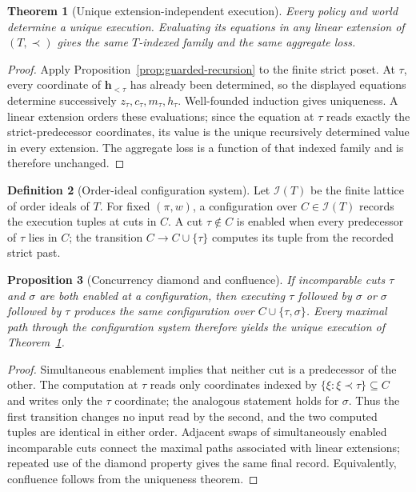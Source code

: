 \documentclass[11pt]{article}
\theoremstyle{plain}
\newtheorem{theorem}{Theorem}[section]
\newtheorem{proposition}[theorem]{Proposition}
\theoremstyle{definition}
\newtheorem{definition}[theorem]{Definition}
\theoremstyle{remark}
\begin{document}
\begin{theorem}[Unique extension-independent execution]
\label{thm:operational-execution}
Every policy and world determine a unique execution. Evaluating its equations in
any linear extension of $(T,\prec)$ gives the same $T$-indexed family and the
same aggregate loss.
\end{theorem}

\begin{proof}
Apply Proposition~\ref{prop:guarded-recursion} to the finite strict poset. At
$\tau$, every
coordinate of $\mathbf h_{<\tau}$ has already been determined, so the displayed
equations determine successively $z_\tau,c_\tau,m_\tau,h_\tau$. Well-founded
induction gives uniqueness. A linear extension orders these evaluations;
since the equation at $\tau$ reads exactly the strict-predecessor coordinates,
its value is the unique recursively determined value in every extension. The
aggregate loss is a function of that indexed family and is therefore unchanged.
\end{proof}

\begin{definition}[Order-ideal configuration system]
\label{def:order-ideal-configuration}
Let $\mathcal I(T)$ be the finite lattice of order ideals of $T$. For fixed
$(\pi,w)$, a configuration over $C\in\mathcal I(T)$ records the execution
tuples at cuts in $C$. A cut $\tau\notin C$ is enabled when every predecessor
of $\tau$ lies in $C$; the transition $C\to C\cup\{\tau\}$ computes its tuple
from the recorded strict past.
\end{definition}

\begin{proposition}[Concurrency diamond and confluence]
\label{prop:operational-confluence}
If incomparable cuts $\tau$ and $\sigma$ are both enabled at a configuration,
then executing $\tau$ followed by $\sigma$ or $\sigma$ followed by $\tau$
produces the same configuration over $C\cup\{\tau,\sigma\}$. Every maximal path
through the configuration system therefore yields the unique execution of
Theorem~\ref{thm:operational-execution}.
\end{proposition}

\begin{proof}
Simultaneous enablement implies that neither cut is a predecessor of the other.
The computation at $\tau$ reads only coordinates indexed by
$\{\xi:\xi\prec\tau\}\subseteq C$ and writes only the $\tau$ coordinate;
the analogous statement holds for $\sigma$. Thus the first transition changes
no input read by the second, and the two computed tuples are identical in either
order. Adjacent swaps of simultaneously enabled incomparable cuts connect the
maximal paths associated with linear extensions; repeated use of the diamond
property gives the same final record. Equivalently, confluence follows from the
uniqueness theorem.
\end{proof}
\end{document}
